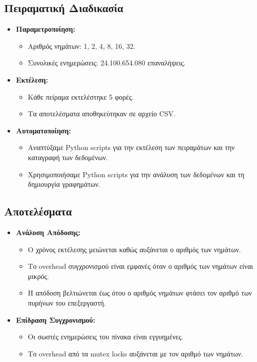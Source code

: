 \documentclass{article}
\begin{document}
\subsection*{Πειραματική Διαδικασία}
\begin{itemize}
    \item \textbf{Παραμετροποίηση:}
    \begin{itemize}
        \item Αριθμός νημάτων: 1, 2, 4, 8, 16, 32.
        \item Συνολικές ενημερώσεις: 24.100.654.080 επαναλήψεις.
    \end{itemize}
    \item \textbf{Εκτέλεση:}
    \begin{itemize}
        \item Κάθε πείραμα εκτελέστηκε 5 φορές.
        \item Τα αποτελέσματα αποθηκεύτηκαν σε αρχείο CSV.
    \end{itemize}
    \item \textbf{Αυτοματοποίηση:}
    \begin{itemize}
        \item Αναπτύξαμε Python scripts για την εκτέλεση των πειραμάτων και την καταγραφή των δεδομένων.
        \item Χρησιμοποιήσαμε Python scripts για την ανάλυση των δεδομένων και τη δημιουργία γραφημάτων.
    \end{itemize}
\end{itemize}
\subsection*{Αποτελέσματα}
\begin{itemize}
    \item \textbf{Ανάλυση Απόδοσης:}
    \begin{itemize}
        \item Ο χρόνος εκτέλεσης μειώνεται καθώς αυξάνεται ο αριθμός των νημάτων.
        \item Το overhead συγχρονισμού είναι εμφανές όταν ο αριθμός των νημάτων είναι μικρός.
        \item Η απόδοση βελτιώνεται έως ότου ο αριθμός νημάτων φτάσει τον αριθμό των πυρήνων του επεξεργαστή.
    \end{itemize}
    \item \textbf{Επίδραση Συγχρονισμού:}
    \begin{itemize}
        \item Οι σωστές ενημερώσεις του πίνακα είναι εγγυημένες.
        \item Το overhead από τα mutex locks αυξάνεται με τον αριθμό των νημάτων.
    \end{itemize}
\end{itemize}
\end{document}
